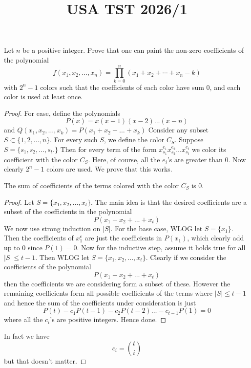 \documentclass[11pt]{scrartcl}
\title{USA TST 2026/1}
\begin{document}
\maketitle

\begin{problem*}{}{}
    Let $n$ be a positive integer. Prove that one can paint the non-zero coefficients of the polynomial
\[ f(x_1, x_2, \dots, x_n) = \prod_{k=0}^n (x_1 + x_2 + \dotsb + x_n - k) \]with $2^n - 1$ colors such that the coefficients of each color have sum $0$, and each color is used at least once.
\end{problem*}
\begin{proof}
    For ease, define the polynomials \[P(x) = x(x-1)(x-2)\dots(x-n)\]and \(Q(x_1,x_2,\dots,x_k)=P(x_1+x_2+\dots+x_k)\)
    Consider any subset \(S \subset \{1, 2, \dots, n\}\). For every such \(S\), we define the color \(C_S.\) Suppose \(S = \{s_1, s_2, \dots, s_t.\}\) Then for every term of the form \(x_{s_1}^{e_1}x_{s_2}^{e_2}\dots x_{s_t}^{e_t}\) we color its coefficient with the color \(C_S.\) Here, of course, all the \(e_i\)'s are greater than \(0\). Now clearly \(2^n - 1\) colors are used. We prove that this works.

\begin{claim*}{}{}
    The sum of coefficients of the terms colored with the color \(C_S\) is \(0\).
\end{claim*}
\begin{proof} 
    Let \(S = \{x_1, x_2, \dots, x_t\}\). The main idea is that the desired coefficients are a subset of the coefficients in the polynomial\[P(x_1 + x_2 + \dots + x_t)\]We now use strong induction on \(|S|\). For the base case, WLOG let \(S = \{x_1\}.\) Then the coefficients of \(x_1^e\) are just the coefficients in \(P(x_1)\), which clearly add up to \(0\) since \(P(1) = 0.\) Now for the inductive step, assume it holds true for all \(|S| \le t-1.\) Then WLOG let \(S = \{x_1, x_2, \dots, x_t\}\). Clearly if we consider the coefficients of the polynomial \[P(x_1 + x_2 +\dots + x_t)\] then the coefficients we are considering form a subset of these. However the remaining coefficients form all possible coefficients of the terms where \(|S| \le t-1\) and hence the sum of the coefficients under consideration is just \[P(t) - c_1P(t-1) - c_2P(t-2) \dots -c_{t-1}P(1)=0\]where all the \(c_i\)'s are positive integers. Hence done. 
\end{proof}
In fact we have \[c_i = \binom ti\]but that doesn't matter.
\end{proof}
\end{document}
